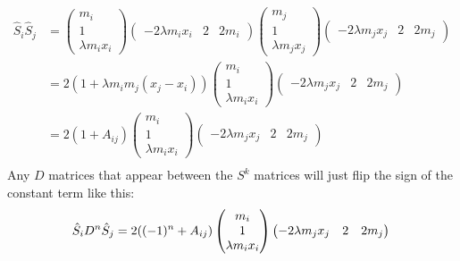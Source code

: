 \documentclass[english,master]{liumaiex}
\theoremstyle{plain}
\theoremstyle{definition}
\begin{document}
\begin{equation}
\begin{aligned}
	\hat{S}_i \hat{S}_{j} &=
	\begin{pmatrix}
		m_i \\ 1 \\ \lambda m_i x_i
	\end{pmatrix}
	\begin{pmatrix}
		-2\lambda m_i x_i & 2 & 2 m_i
	\end{pmatrix}
	\begin{pmatrix}
		m_j \\ 1 \\ \lambda m_j x_j
	\end{pmatrix}
	\begin{pmatrix}
		-2\lambda m_j x_j & 2 & 2 m_j
	\end{pmatrix} \\
	&=
	2(1 + \lambda m_i m_j (x_j - x_i))
	\begin{pmatrix}
		m_i \\ 1 \\ \lambda m_i x_i
	\end{pmatrix}
	\begin{pmatrix}
		-2\lambda m_j x_j & 2 & 2 m_j
	\end{pmatrix} \\
	&= 2(1 + A_{ij})
	\begin{pmatrix}
		m_i \\ 1 \\ \lambda m_i x_i
	\end{pmatrix}
	\begin{pmatrix}
		-2\lambda m_j x_j & 2 & 2 m_j
	\end{pmatrix} \\
\end{aligned}
\end{equation}
Any $D$ matrices that appear between the $S^k$ matrices will just flip the sign of the constant term like this:
\begin{equation}
	\hat{S}_i D^n \hat{S}_j
	= 2((-1)^n + A_{ij})
	\begin{pmatrix}
		m_i \\ 1 \\ \lambda m_i x_i
	\end{pmatrix}
	\begin{pmatrix}
		-2\lambda m_j x_j & 2 & 2 m_j
	\end{pmatrix} \\
\end{equation}
\end{document}
